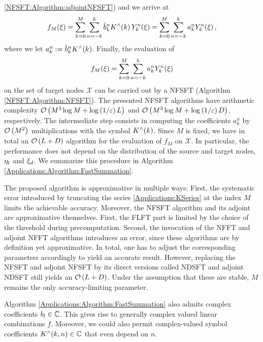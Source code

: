 \ref{NFSFT:Algorithm:adjointNFSFT}) and we arrive at
\[
  f_{M}{\hspace{-0.4ex}}\left(\xi\right) = \sum_{k=0}^{M} \sum_{n=-k}^k \tilde{b}_{k}^n K^{\wedge}{\hspace{-0.4ex}}\left(k\right)
                     Y_{k}^n{\hspace{-0.4ex}}\left(\mathbf{\xi}\right) = \sum_{k=0}^{M} \sum_{n=-k}^k a_{k}^n
                     Y_{k}^n{\hspace{-0.4ex}}\left(\mathbf{\xi}\right),
\]
where we let $a_{k}^n := \tilde{b}_{k}^n K^{\wedge}{\hspace{-0.4ex}}\left(k\right)$. Finally, the evaluation of
\begin{equation}
\label{Applications:NDSFT}
  f_{M}{\hspace{-0.4ex}}\left(\mathbf{\xi}\right) = \sum_{k=0}^{M} \sum_{n=-k}^k a_{k}^n Y_{k}^n{\hspace{-0.4ex}}\left(\mathbf{\xi}\right)
\end{equation}
on the set of target nodes $\mathcal{X}$ can be carried out by a NFSFT 
(Algorithm \ref{NFSFT:Algorithm:NFSFT}). The presented NFSFT algorithms have arithmetic complexity 
$\mathcal{O}\left(M^3 \log M + \log{\hspace{-0.4ex}}\left(1/\varepsilon\right)L\right)$ and 
$\mathcal{O}\left(M^3 \log M + \log{\hspace{-0.4ex}}\left(1/\varepsilon\right)D\right)$, respectively. The intermediate 
step consists in computing the coefficients $a_{k}^n$ by $\mathcal{O}\left(M^2\right)$ multiplications
with the symbol $K^{\wedge}{\hspace{-0.4ex}}\left(k\right)$. Since $M$ is fixed, we have in total an
$\mathcal{O}\left(L + D\right)$ algorithm for the evaluation of $f_{M}$ on $\mathcal{X}$. In particular, the
performance does not depend on the distribution of the source and target nodes, 
$\mathbf{\eta}_{l}$ and $\mathbf{\xi}_{d}$. We summarize this procedure in Algorithm 
\ref{Applications:Algorithm:FastSummation}.

\begin{remark}
  The proposed algorithm is approximative in multiple ways: First, the systematic 
  error introduced by truncating the series \eqref{Applications:KSeries} at the 
  index $M$ limits the 
  achievable accuracy. Moreover, the NFSFT algorithm and its adjoint 
  are approximative themselves. First, the FLFT part is limited by the choice of the
  threshold during precomputation. Second, the invocation of the NFFT and adjoint 
  NFFT algorithms introduces an error, since these algorithms are by definition yet
  approximative. In total, one has to adjust the corresponding parameters accordingly 
  to yield an accurate result.
  However, replacing the NFSFT and adjoint NFSFT by its direct versions called NDSFT and 
  adjoint NDSFT still yields an $\mathcal{O}\left(L + D\right)$. Under the assumption that these are 
  stable, $M$ remains the only accuracy-limiting parameter.
\end{remark}

\begin{remark}
  Algorithm \ref{Applications:Algorithm:FastSummation} also admits complex 
  coefficients $b_{l} \in \mathbb{C}$. This gives rise to generally complex valued 
  linear combinations $f$. Moreover, we could also permit complex-valued 
  symbol coefficients $K^{\wedge}{\hspace{-0.4ex}}\left(k,n\right) \in \mathbb{C}$ that even depend on $n$. 
\end{remark}

